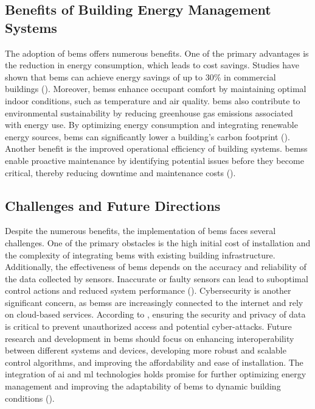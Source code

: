\subsection*{Benefits of Building Energy Management Systems}
The adoption of \gls{bems} offers numerous benefits.
One of the primary advantages is the reduction in energy consumption, which leads to cost savings.
Studies have shown that \gls{bems} can achieve energy savings of up to 30\% in commercial buildings (\cite{Wags2024}).
Moreover, \glspl{bems} enhance occupant comfort by maintaining optimal indoor conditions, such as temperature and air quality.
\gls{bems} also contribute to environmental sustainability by reducing greenhouse gas emissions associated with energy use.
By optimizing energy consumption and integrating renewable energy sources, \gls{bems} can significantly lower a building's carbon footprint (\cite{Lee2016}).
Another benefit is the improved operational efficiency of building systems.
\glspl{bems} enable proactive maintenance by identifying potential issues before they become critical, thereby reducing downtime and maintenance costs (\cite{Klein2012}).

\subsection*{Challenges and Future Directions}
Despite the numerous benefits, the implementation of \gls{bems} faces several challenges.
One of the primary obstacles is the high initial cost of installation and the complexity of integrating \gls{bems} with existing building infrastructure.
Additionally, the effectiveness of \gls{bems} depends on the accuracy and reliability of the data collected by sensors.
Inaccurate or faulty sensors can lead to suboptimal control actions and reduced system performance (\cite{Kokogiannakis2008}).
Cybersecurity is another significant concern, as \glspl{bems} are increasingly connected to the internet and rely on cloud-based services.
According to \cite{Minoli2017}, ensuring the security and privacy of data is critical to prevent unauthorized access and potential cyber-attacks.
Future research and development in \gls{bems} should focus on enhancing interoperability between different systems and devices, developing more robust and scalable control algorithms, and improving the affordability and ease of installation.
The integration of \gls{ai} and \gls{ml} technologies holds promise for further optimizing energy management and improving the adaptability of \gls{bems} to dynamic building conditions (\cite{Amasyali2018}).

